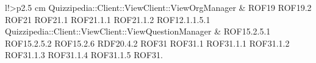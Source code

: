 \begin{tabella}{l!{\VRule}>{\centering\arraybackslash}p{2.5 cm}}
Quizzipedia::Client::ViewClient::ViewOrgManager & ROF19 \linebreak ROF19.2 \linebreak ROF21 \linebreak ROF21.1 \linebreak ROF21.1.1 \linebreak ROF21.1.2 \linebreak ROF12.1.1.5.1 \\
Quizzipedia::Client::ViewClient::ViewQuestionManager & ROF15.2.5.1 \linebreak ROF15.2.5.2 \linebreak ROF15.2.6 \linebreak RDF20.4.2 \linebreak ROF31 \linebreak ROF31.1 \linebreak ROF31.1.1 \linebreak ROF31.1.2 \linebreak ROF31.1.3 \linebreak ROF31.1.4 \linebreak ROF31.1.5 \linebreak ROF31.
\end{tabella}
